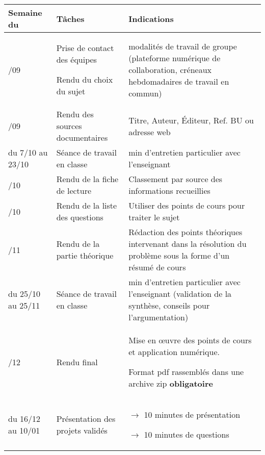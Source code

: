\begin{center}
\begin{tabular}{|p{}|p{}|p{}|}
\hline
\size Semaine du	& \size Tâches						& \size Indications\\
\hline
\hline
\color {red}\size 23/09 \color {black} & \size Prise de contact des équipes \par Rendu du choix du sujet	& \size modalités de travail de groupe (plateforme numérique de collaboration, créneaux hebdomadaires de travail en commun)\\
\hline
\size 30/09		& \size Rendu des sources documentaires 		& \size Titre, Auteur, Éditeur, Ref. BU ou adresse web \\
\hline
\size du 7/10 au 23/10	& \size Séance de travail en classe 	& \size 30 min d'entretien particulier avec l'enseignant\e \\
\hline
\size 21/10		& \size Rendu de la fiche de lecture	& \size Classement par source des informations recueillies \\
\hline
\size 28/10		& \size Rendu de la liste des questions	& \size Utiliser des points de cours  pour traiter le sujet \\
\hline
\size 10/11		& \size Rendu de la partie théorique	& \size Rédaction des points théoriques intervenant dans la résolution du problème sous la forme d'un résumé de cours \\	\hline
\size du 25/10 au 25/11	& \size Séance de travail en classe 	& \size 30 min d'entretien particulier avec l'enseignant (validation de la synthèse, conseils pour l'argumentation)\\
\hline
\size 9/12		& \size Rendu final & \size Mise en \oe uvre des points de cours et application numérique. \par Format pdf rassemblés dans une archive zip \textbf{obligatoire}\\
\hline
\size du 16/12 au 10/01 & \size Présentation des projets validés & \size $\rightarrow$ 10 minutes de présentation \par $\rightarrow$ 10 minutes de questions\\
\hline
\end{tabular}
\end{center}
